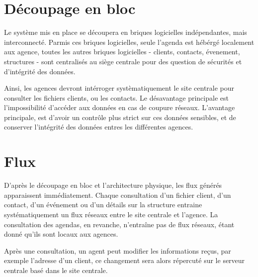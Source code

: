 \section{Découpage en bloc}
    
    Le système mis en place se découpera en briques logicielles indépendantes, mais interconnecté.
    Parmis ces briques logicielles, seule l'agenda est hébérgé localement aux agence, toutes les autres briques logicielles - clients, contacts, évenement, structures - sont centralisés au siège centrale pour des question de sécurités et d'intégrité des données.
    
    Ainsi, les agences devront intérroger systèmatiquement le site centrale pour consulter les fichiers clients, ou les contacts.
    Le désavantage principale est l'impossibilité d'accéder aux données en cas de coupure réseaux.
    L'avantage principale, est d'avoir un contrôle plus strict sur ces données sensibles, et de conserver l'intégrité des données entres les différentes agences.
    
\section{Flux}

    D'après le découpage en bloc et l'architecture physique, les flux générés apparaissent immédiatement.
    Chaque consultation d'un fichier client, d'un contact, d'un événement ou d'un détails sur la structure entraine systématiquement un flux réseaux entre le site centrale et l'agence.
    La consultation des agendas, en revanche, n'entraîne pas de flux réseaux, étant donné qu'ils sont locaux aux agences.
    
    Après une consultation, un agent peut modifier les informations reçus, par exemple l'adresse d'un client, ce changement sera alors répercuté sur le serveur centrale basé dans le site centrale.
